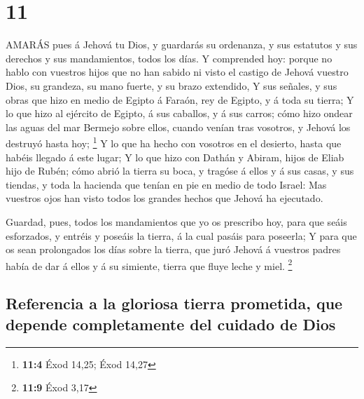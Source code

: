 \hypertarget{section-10}{%
\section{11}\label{section-10}}

 AMARÁS pues á Jehová tu Dios, y guardarás su ordenanza, y
sus estatutos y sus derechos y sus mandamientos, todos los días.
 Y comprended hoy: porque no hablo con vuestros hijos que no
han sabido ni visto el castigo de Jehová vuestro Dios, su grandeza, su
mano fuerte, y su brazo extendido,  Y sus señales, y sus
obras que hizo en medio de Egipto á Faraón, rey de Egipto, y á toda su
tierra;  Y lo que hizo al ejército de Egipto, á sus
caballos, y á sus carros; cómo hizo ondear las aguas del mar Bermejo
sobre ellos, cuando venían tras vosotros, y Jehová los destruyó hasta
hoy; \footnote{\textbf{11:4} Éxod 14,25; Éxod 14,27}  Y lo
que ha hecho con vosotros en el desierto, hasta que habéis llegado á
este lugar;  Y lo que hizo con Dathán y Abiram, hijos de
Eliab hijo de Rubén; cómo abrió la tierra su boca, y tragóse á ellos y á
sus casas, y sus tiendas, y toda la hacienda que tenían en pie en medio
de todo Israel:  Mas vuestros ojos han visto todos los
grandes hechos que Jehová ha ejecutado.

 Guardad, pues, todos los mandamientos que yo os prescribo
hoy, para que seáis esforzados, y entréis y poseáis la tierra, á la cual
pasáis para poseerla;  Y para que os sean prolongados los
días sobre la tierra, que juró Jehová á vuestros padres había de dar á
ellos y á su simiente, tierra que fluye leche y miel. \footnote{\textbf{11:9}
  Éxod 3,17}

\hypertarget{referencia-a-la-gloriosa-tierra-prometida-que-depende-completamente-del-cuidado-de-dios}{%
\subsection{Referencia a la gloriosa tierra prometida, que depende
completamente del cuidado de
Dios}\label{referencia-a-la-gloriosa-tierra-prometida-que-depende-completamente-del-cuidado-de-dios}}

